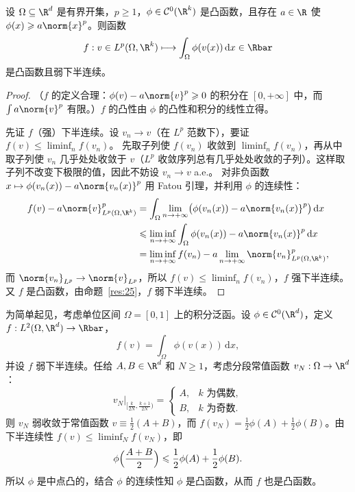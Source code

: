 \begin{proposition}
\label{res:29}
设 $\Omega\subseteq\R^d$ 是有界开集，$p\geqslant1$，$\phi\in\mathcal{C}^0(\R^k)$ 是凸函数，且存在 $a\in\R$ 使 $\phi(x)\geqslant a\norm{x}^p$。则函数
\[
  f:v\in L^p(\Omega,\R^k)\longmapsto\int_\Omega\phi(v(x))\,\mathrm{d}x\in\Rbar
\]
是凸函数且弱下半连续。
\end{proposition}

\begin{proof}
（$f$ 的定义合理：$\phi(v)-a\norm{v}^p\geqslant0$ 的积分在 $[0,+\infty]$ 中，而 $\int a\norm{v}^p$ 有限。）$f$ 的凸性由 $\phi$ 的凸性和积分的线性立得。

先证 $f$（强）下半连续。设 $v_n\to v$（在 $L^p$ 范数下），要证 $f(v)\leqslant\liminf_nf(v_n)$。
先取子列使 $f(v_n)$ 收敛到 $\liminf_nf(v_n)$，再从中取子列使 $v_n$ 几乎处处收敛于 $v$（$L^p$ 收敛序列总有几乎处处收敛的子列）。这样取子列不改变下极限的值，因此不妨设 $v_n\to v$ a.e.。
对非负函数 $x\mapsto\phi(v_n(x))-a\norm{v_n(x)}^p$ 用 Fatou 引理，并利用 $\phi$ 的连续性：
\begin{align*}
  f(v)-a\norm{v}_{L^p(\Omega,\R^k)}^p
  &=\int_\Omega\lim_{n\to+\infty}\bigl(\phi(v_n(x))-a\norm{v_n(x)}^p\bigr)\,\mathrm{d}x\\
  &\leqslant\liminf_{n\to+\infty}\int_\Omega\phi(v_n(x))-a\norm{v_n(x)}^p\,\mathrm{d}x\\
  &=\liminf_{n\to+\infty}f(v_n)-a\lim_{n\to+\infty}\norm{v_n}_{L^p(\Omega,\R^k)}^p ,
\end{align*}
而 $\norm{v_n}_{L^p}\to\norm{v}_{L^p}$，所以 $f(v)\leqslant\liminf_nf(v_n)$，$f$ 强下半连续。
又 $f$ 是凸函数，由命题~\ref{res:25}，$f$ 弱下半连续。
\end{proof}

\begin{remark}[弱下半连续的积分泛函必是凸的]
\label{rem:9}
为简单起见，考虑单位区间 $\Omega=[0,1]$ 上的积分泛函。设 $\phi\in\mathcal{C}^0(\R^d)$，定义 $f:L^2(\Omega,\R^d)\to\Rbar$，
\[
  f(v)=\int_\Omega\phi(v(x))\,\mathrm{d}x ,
\]
并设 $f$ 弱下半连续。任给 $A,B\in\R^d$ 和 $N\geqslant1$，考虑分段常值函数 $v_N:\Omega\to\R^d$：
\[
  v_N\big|_{[\frac{k}{2N},\frac{k+1}{2N})}=
  \begin{cases}
    A, & k\text{ 为偶数},\\
    B, & k\text{ 为奇数}.
  \end{cases}
\]
则 $v_N$ 弱收敛于常值函数 $v\equiv\frac12(A+B)$，而 $f(v_N)=\frac12\phi(A)+\frac12\phi(B)$。由下半连续性 $f(v)\leqslant\liminf_Nf(v_N)$，即
\[
  \phi\Bigl(\frac{A+B}{2}\Bigr)\leqslant\frac12\phi(A)+\frac12\phi(B).
\]
所以 $\phi$ 是中点凸的，结合 $\phi$ 的连续性知 $\phi$ 是凸函数，从而 $f$ 也是凸函数。
\end{remark}

